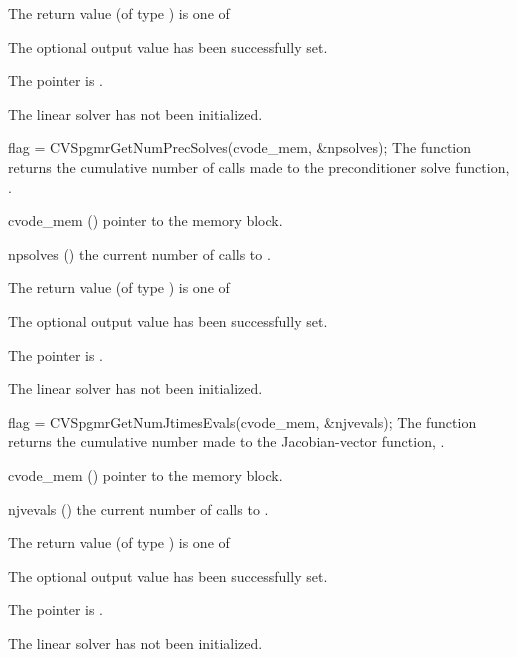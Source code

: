 {
  The return value  (of type ) is one of
  \begin{args}
  \item[\Id{CVSPGMR\_SUCCESS}] 
    The optional output value has been successfully set.
  \item[\Id{CVSPGMR\_MEM\_NULL}]
    The  pointer is .
  \item[\Id{CVSPGMR\_LMEM\_NULL}]
    The {\cvspgmr} linear solver has not been initialized.
  \end{args}
}
{}
{
  flag = CVSpgmrGetNumPrecSolves(cvode\_mem, \&npsolves);
}
{
  The function  returns the
  cumulative number of calls made to the preconditioner 
  solve function, .
}
{
  \begin{args}
  \item[cvode\_mem] ()
    pointer to the {\cvode} memory block.
  \item[npsolves] ()
    the current number of calls to .
  \end{args}
}
{
  The return value  (of type ) is one of
  \begin{args}
  \item[\Id{CVSPGMR\_SUCCESS}] 
    The optional output value has been successfully set.
  \item[\Id{CVSPGMR\_MEM\_NULL}]
    The  pointer is .
  \item[\Id{CVSPGMR\_LMEM\_NULL}]
    The {\cvspgmr} linear solver has not been initialized.
  \end{args}
}
{}
{
  flag = CVSpgmrGetNumJtimesEvals(cvode\_mem, \&njvevals);
}
{
  The function  returns the
  cumulative number made to the Jacobian-vector function,
  .
}
{
  \begin{args}
  \item[cvode\_mem] ()
    pointer to the {\cvode} memory block.
  \item[njvevals] ()
    the current number of calls to .
  \end{args}
}
{
  The return value  (of type ) is one of
  \begin{args}
  \item[\Id{CVSPGMR\_SUCCESS}] 
    The optional output value has been successfully set.
  \item[\Id{CVSPGMR\_MEM\_NULL}]
    The  pointer is .
  \item[\Id{CVSPGMR\_LMEM\_NULL}]
    The {\cvspgmr} linear solver has not been initialized.
  \end{args}
}
